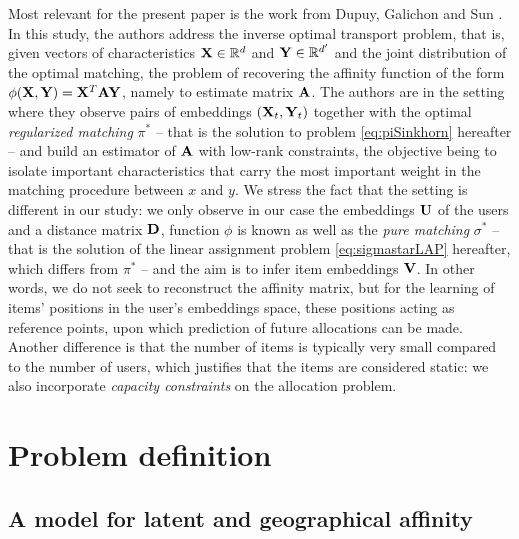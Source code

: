 Most relevant for the present paper is the work from Dupuy, Galichon and Sun \cite{dupuy_estimating_2016}. In this study, the authors address the inverse optimal transport problem, that is, given vectors of characteristics $\mathbf{X} \in \mathbb{R}^d$ and $\mathbf{Y} \in \mathbb{R}^{d'}$ and the joint distribution of the optimal matching, the problem of recovering the affinity function of the form $\phi(\mathbf{X},\mathbf{Y})=\mathbf{X}^T \mathbf{A} \mathbf{Y}$, namely to estimate matrix $\mathbf{A}$. The authors are in the setting where they observe pairs of embeddings $(\mathbf{X}_t,\mathbf{Y}_t)$ together with the optimal \emph{regularized matching} $\pi^*$ -- that is the solution to problem \eqref{eq:piSinkhorn} hereafter -- and build an estimator of $\mathbf{A}$ with low-rank constraints, the objective being to isolate important characteristics that carry the most important weight in the matching procedure between $x$ and $y$. We stress the fact that the setting is different in our study:
we only observe in our case the embeddings $\mathbf{U}$ of the users and a distance matrix $\mathbf{D}$, function $\phi$ is known as well as the \emph{pure matching} $\sigma^*$ -- that is the solution of the linear assignment problem \eqref{eq:sigmastarLAP} hereafter, which differs from $\pi^*$ -- and the aim is to infer item embeddings $\mathbf{V}$. In other words, we do not seek to reconstruct the affinity matrix, but for the learning of items' positions in the user's embeddings space, these positions acting as reference points, upon which prediction of future allocations can be made. Another difference is that the number of items is typically very small compared to the number of users, which justifies that the items are considered static: we also incorporate \emph{capacity constraints} on the allocation problem.

\section{Problem definition}

\subsection*{A model for latent and geographical affinity}

